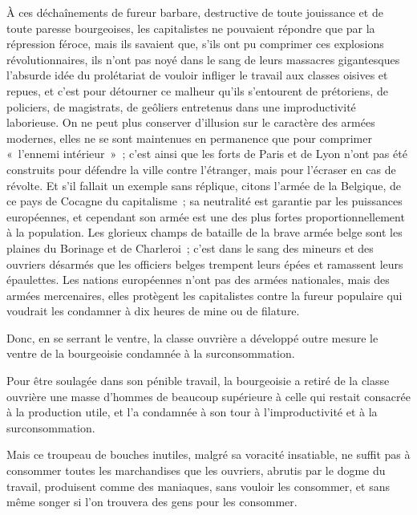 \documentclass[french,twoside]{book} %
\begin{document}
À ces déchaînements de fureur barbare, destructive de toute jouissance et de toute paresse bourgeoises, les capitalistes ne pouvaient répondre que par la répression féroce, mais ils savaient que, s’ils ont pu comprimer ces explosions révolutionnaires, ils n’ont pas noyé dans le sang de leurs massacres gigantesques l’absurde idée du prolétariat de vouloir infliger le travail aux classes oisives et repues, et c’est pour détourner ce malheur qu’ils s’entourent de prétoriens, de policiers, de magistrats, de geôliers entretenus dans une improductivité laborieuse. On ne peut plus conserver d’illusion sur le caractère des armées modernes, elles ne se sont maintenues en permanence que pour comprimer « l’ennemi intérieur » ; c’est ainsi que les forts de Paris et de Lyon n’ont pas été construits pour défendre la ville contre l’étranger, mais pour l’écraser en cas de révolte. Et s’il fallait un exemple sans réplique, citons l’armée de la Belgique, de ce pays de Cocagne du capitalisme ; sa neutralité est garantie par les puissances européennes, et cependant son armée est une des plus fortes proportionnellement à la population. Les glorieux champs de bataille de la brave armée belge sont les plaines du Borinage et de Charleroi ; c’est dans le sang des mineurs et des ouvriers désarmés que les officiers belges trempent leurs épées et ramassent leurs épaulettes. Les nations européennes n’ont pas des armées nationales, mais des armées mercenaires, elles protègent les capitalistes contre la fureur populaire qui voudrait les condamner à dix heures de mine ou de filature.\par
Donc, en se serrant le ventre, la classe ouvrière a développé outre mesure le ventre de la bourgeoisie condamnée à la surconsommation.\par
Pour être soulagée dans son pénible travail, la bourgeoisie a retiré de la classe ouvrière une masse d’hommes de beaucoup supérieure à celle qui restait consacrée à la production utile, et l’a condamnée à son tour à l’improductivité et à la surconsommation.\par
Mais ce troupeau de bouches inutiles, malgré sa voracité insatiable, ne suffit pas à consommer toutes les marchandises que les ouvriers, abrutis par le dogme du travail, produisent comme des maniaques, sans vouloir les consommer, et sans même songer si l’on trouvera des gens pour les consommer.\par
\end{document}
